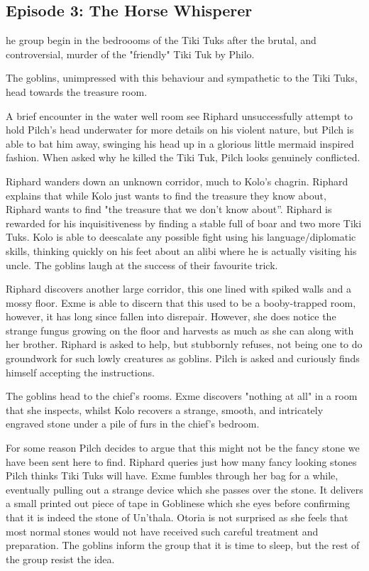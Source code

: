 \subsection{Episode 3: The Horse Whisperer}

he group begin in the bedroooms of the Tiki Tuks after the brutal, and controversial, murder of the "friendly" Tiki Tuk by Philo.\medskip

The goblins, unimpressed with this behaviour and sympathetic to the Tiki Tuks, head towards the treasure room.\medskip

A brief encounter in the water well room see Riphard unsuccessfully attempt to hold Pilch’s head underwater for more details on his violent nature, but Pilch is able to bat him away, swinging his head up in a glorious little mermaid inspired fashion. When asked why he killed the Tiki Tuk, Pilch looks genuinely conflicted.\medskip

Riphard wanders down an unknown corridor, much to Kolo's chagrin. Riphard explains that while Kolo just wants to find the treasure they know about, Riphard wants to find "the treasure that we don't know about”. Riphard is rewarded for his inquisitiveness by finding a stable full of boar and two more Tiki Tuks. Kolo is able to deescalate any possible fight using his language/diplomatic skills, thinking quickly on his feet about an alibi where he is actually visiting his uncle. The goblins laugh at the success of their favourite trick.\medskip

Riphard discovers another large corridor, this one lined with spiked walls and a mossy floor. Exme is able to discern that this used to be a booby-trapped room, however, it has long since fallen into disrepair. However, she does notice the strange fungus growing on the floor and harvests as much as she can along with her brother. Riphard is asked to help, but stubbornly refuses, not being one to do groundwork for such lowly creatures as goblins. Pilch is asked and curiously finds himself accepting the instructions.\medskip

The goblins head to the chief’s rooms. Exme discovers "nothing at all" in a room that she inspects, whilst Kolo recovers a strange, smooth, and intricately engraved stone under a pile of furs in the chief’s bedroom.\medskip

For some reason Pilch decides to argue that this might not be the fancy stone we have been sent here to find. Riphard queries just how many fancy looking stones Pilch thinks Tiki Tuks will have. Exme fumbles through her bag for a while, eventually pulling out a strange device which she passes over the stone. It delivers a small printed out piece of tape in Goblinese which she eyes before confirming that it is indeed the stone of Un’thala. Otoria is not surprised as she feels that most normal stones would not have received such careful treatment and preparation. The goblins inform the group that it is time to sleep, but the rest of the group resist the idea.\medskip


